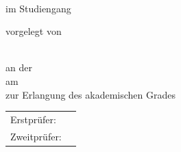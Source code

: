 \begin{titlepage}
  \centering


  \vspace{20mm}
  {\huge{\getDoctype{}}}\\

  {\large im Studiengang \getCourseOfStudies{}}

  \vspace{10mm}
  {\huge\bfseries \getTitle{} \par}

  \vspace*{10mm}
  vorgelegt von 

  {\large \getAuthor{}} \\
  an der \getUniversity{} \\
  am \getSubmissionDate{} \\

  \vspace{5mm}
  zur Erlangung des akademischen Grades \\
  \getAcademicDegree{}

  \vspace{15mm}
  \begin{tabular}{l l}
    Erstprüfer:      & \getSupervisor{} \\
    Zweitprüfer:     & \getAdvisor{} \\
  \end{tabular}

\end{titlepage}
